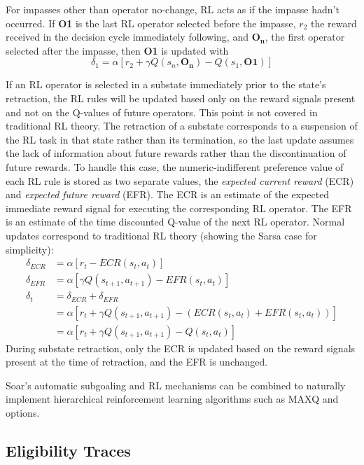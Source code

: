 For impasses other than operator no-change, RL acts as if the impasse hadn't occurred.
If \textbf{O1} is the last RL operator selected before the impasse, $r_2$ the reward received in the decision cycle immediately following, and \textbf{O}$_\textbf{n}$, the first operator selected after the impasse, then \textbf{O1} is updated with 
$$\delta_1 = \alpha \left[ r_2 + \gamma Q(s_n, \textbf{O}_\textbf{n}) - Q(s_1, \textbf{O1}) \right]$$

If an RL operator is selected in a substate immediately prior to the state's retraction, the RL rules will be updated based only on the reward signals present and not on the Q-values of future operators.
This point is not covered in traditional RL theory.
The retraction of a substate corresponds to a suspension of the RL task in that state rather than its termination, so the last update assumes the lack of information about future rewards rather than the discontinuation of future rewards.
To handle this case, the numeric-indifferent preference value of each RL rule is stored as two separate values, the \textit{expected current reward} (ECR) and \textit{expected future reward} (EFR).
The ECR is an estimate of the expected immediate reward signal for executing the corresponding RL operator.
The EFR is an estimate of the time discounted Q-value of the next RL operator.
Normal updates correspond to traditional RL theory (showing the Sarsa case for simplicity):
\begin{align*}
\delta_{ECR} &= \alpha \left[ r_t - ECR(s_t, a_t) \right] \\
\delta_{EFR} &= \alpha \left[ \gamma Q(s_{t+1}, a_{t+1}) - EFR(s_t, a_t) \right] \\
\delta_t &= \delta_{ECR} + \delta_{EFR} \\
&= \alpha \left[ r_t + \gamma Q(s_{t+1}, a_{t+1}) - \left( ECR(s_t, a_t) + EFR(s_t, a_t) \right) \right] \\
&= \alpha \left[ r_t + \gamma Q(s_{t+1}, a_{t+1}) - Q(s_t, a_t) \right]
\end{align*}
During substate retraction, only the ECR is updated based on the reward signals present at the time of retraction, and the EFR is unchanged.

Soar's automatic subgoaling and RL mechanisms can be combined to naturally implement hierarchical reinforcement learning algorithms such as MAXQ and options.

\subsection{Eligibility Traces}
\label{RL-et}

